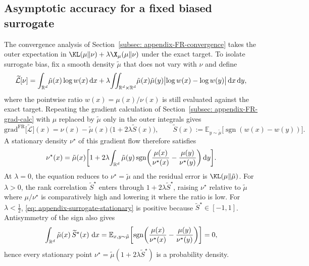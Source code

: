 \documentclass{article}
\begin{document}
\subsection{Asymptotic accuracy for a fixed biased surrogate}
\label{subsec: appendix-accuracy}

The convergence analysis of Section~\ref{subsec: appendix-FR-convergence} takes the outer expectation in $\KL(\mu\|\nu)+\lambda\X_\mu(\mu\|\nu)$ under the exact target. To isolate surrogate bias, fix a smooth density $\tilde\mu$ that does not vary with $\nu$ and define
\begin{equation}
    \widetilde{\mathcal L}[\nu]
    = \int_{\mathbb R^d}\!\tilde\mu(x)\log w(x)\,\mathrm d x
    + \lambda\!\iint_{\mathbb R^d\times\mathbb R^d}\!\tilde\mu(x)\tilde\mu(y)\bigl|\log w(x) - \log w(y)\bigr|\,\mathrm d x\,\mathrm d y,
    \label{eq: appendix-surrogate-loss}
\end{equation}
where the pointwise ratio $w(x)=\mu(x)/\nu(x)$ is still evaluated against the exact target. Repeating the gradient calculation of Section~\ref{subsec: appendix-FR-grad-calc} with $\mu$ replaced by $\tilde\mu$ only in the outer integrals gives
\begin{equation*}
    \mathrm{grad}^{\mathrm{FR}}\bigl[\widetilde{\mathcal L}\bigr](x) = \nu(x) - \tilde\mu(x)\bigl(1 + 2\lambda \widetilde S(x)\bigr),
    \qquad
    \widetilde S(x) := \mathbb E_{y\sim\tilde\mu}\bigl[\operatorname{sgn}(w(x) - w(y))\bigr].
\end{equation*}
A stationary density $\nu^\star$ of this gradient flow therefore satisfies
\begin{equation}
    \nu^\star(x) = \tilde\mu(x)\biggl[1 + 2\lambda\!\int_{\mathbb R^d}\tilde\mu(y)\operatorname{sgn}\biggl(\frac{\mu(x)}{\nu^\star(x)} - \frac{\mu(y)}{\nu^\star(y)}\biggr)\,\mathrm d y\biggr].
    \label{eq: appendix-surrogate-stationary}
\end{equation}
At $\lambda=0$, the equation reduces to $\nu^\star=\tilde\mu$ and the residual error is $\KL(\mu\|\tilde\mu)$. For $\lambda>0$, the rank correlation $\widetilde S^\star$ enters through $1+2\lambda\widetilde S^\star$, raising $\nu^\star$ relative to $\tilde\mu$ where $\mu/\nu^\star$ is comparatively high and lowering it where the ratio is low. For $\lambda<\frac12$, \eqref{eq: appendix-surrogate-stationary} is positive because $\widetilde S^\star\in[-1,1]$. Antisymmetry of the sign also gives
\begin{equation*}
    \int_{\mathbb R^d} \tilde\mu(x)\, \widetilde S^\star(x)\, \,\mathrm d x
    = \mathbb E_{x, y \sim \tilde\mu}\biggl[\operatorname{sgn}\biggl(\frac{\mu(x)}{\nu^\star(x)} - \frac{\mu(y)}{\nu^\star(y)}\biggr)\biggr] = 0,
\end{equation*}
hence every stationary point $\nu^\star = \tilde\mu(1 + 2\lambda \widetilde S^\star)$ is a probability density.
\end{document}
